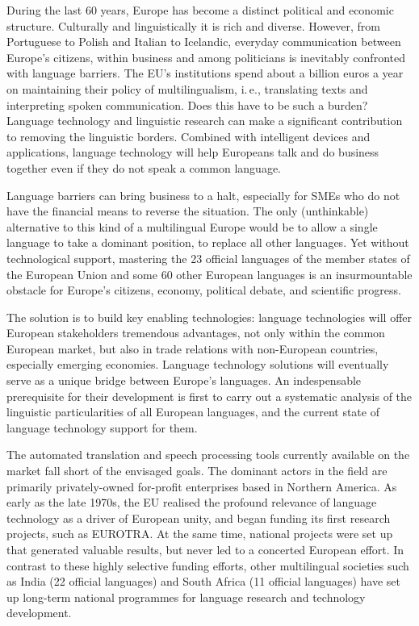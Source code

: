 \vspace*{-4mm}
\begin{multicols}{2}
During the last 60 years, Europe has become a distinct political and economic structure. Culturally and linguistically it is rich and diverse. However, from Portuguese to Polish and Italian to Icelandic, everyday communication between Europe’s citizens, within business and among politicians is inevitably confronted with language barriers. The EU's institutions spend about a billion euros a year on maintaining their policy of multilingualism, i.\,e., translating texts and interpreting spoken communication. Does this have to be such a burden? Language technology and linguistic research can make a significant contribution to removing the linguistic borders. Combined with intelligent devices and applications, language technology will help Europeans talk and do business together even if they do not speak a common language. 


Language barriers can bring business to a halt, especially for SMEs who do not have the financial means to reverse the situation. The only (unthinkable) alternative to this kind of a multilingual Europe would be to allow a single language to take a dominant position, to replace all other languages. 
Yet without technological support, mastering the 23 official languages of the member states of the European Union and some 60 other European languages is an insurmountable obstacle for Europe’s citizens, economy, political debate, and scientific progress. 

The solution is to build key enabling technologies: language technologies will offer European stakeholders tremendous advantages, not only within the common European market, but also in trade relations with non-European countries, especially emerging economies. Language technology solutions will eventually serve as a unique bridge between Europe's languages. An indespensable prerequisite for their development is first to carry out a systematic analysis of the linguistic particularities of all European languages, and the current state of language technology support for them.  
    
The automated translation and speech processing tools currently available on the market fall short of the envisaged goals. The dominant actors in the field are primarily privately-owned for-profit enterprises based in Northern America. As early as the late 1970s, the EU realised the profound relevance of language technology as a driver of European unity, and began funding its first research projects, such as EUROTRA. At the same time, national projects were set up that generated valuable results, but never led to a concerted European effort. In contrast to these highly selective funding efforts, other multilingual societies such as India (22 official languages) and South Africa (11 official languages) have set up long-term national programmes for language research and technology development. 


\end{multicols}
